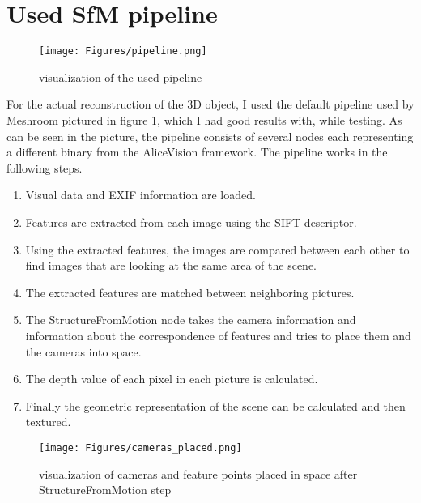 \section{Used SfM pipeline}
\begin{figure}[h!]
	\centering
	\texttt{[image: Figures/pipeline.png]}	
	\caption{visualization of the used pipeline}
	\label{Pipeline_vis}
\end{figure}

For the actual reconstruction of the 3D object, I used the default pipeline used by Meshroom pictured in figure \ref{Pipeline_vis}, which I had good results with, while testing.
As can be seen in the picture, the pipeline consists of several nodes each representing a different binary from the AliceVision framework.
The pipeline works in the following steps. \cite{alicevision_photogrammetry}

\begin{enumerate}

\item Visual data and EXIF information are loaded.
\item Features are extracted from each image using the SIFT descriptor.
\item Using the extracted features, the images are compared between each other to find images that are looking at the same area of the scene.
\item The extracted features are matched between neighboring pictures.
\item The StructureFromMotion node takes the camera information and information about the correspondence of features and tries to place them and the cameras into space.
\item The depth value of each pixel in each picture is calculated.
\item Finally the geometric representation of the scene can be calculated and then textured.

\end{enumerate}

\begin{figure}[h!]
	\centering
	\texttt{[image: Figures/cameras\_placed.png]}	
	\caption{visualization of cameras and feature points placed in space after StructureFromMotion step}
\end{figure}









\endinput